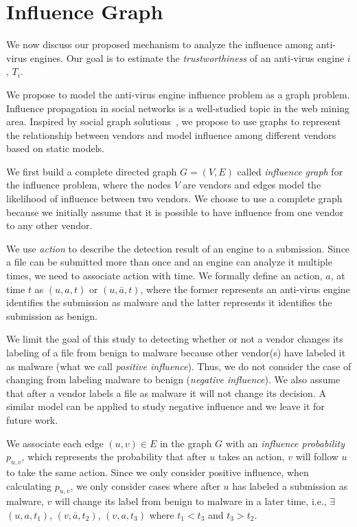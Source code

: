 \vspace{-0.05in}
\section{Influence Graph}
\label{sec:model}
We now discuss our proposed mechanism to analyze the influence among anti-virus engines.
Our goal is to estimate the {\em trustworthiness} of an anti-virus engine $i$, $T_i$.

We propose to model the anti-virus engine influence problem as a graph problem.
Influence propagation in social networks is a well-studied topic in the web mining area. 
Inspired by social graph solutions~\cite{Influence}, we propose to use graphs to represent the relationship between vendors 
and model influence among different vendors based on static models.

We first build a complete directed graph $G = (V, E)$ called {\em influence graph} for the influence problem, 
where the nodes $V$ are vendors and edges model the likelihood of influence between two vendors. 
We choose to use a complete graph because we initially assume that it is possible to have influence from one vendor to any other vendor.

We use {\em action} to describe the detection result of an engine to a submission. Since a file can be
submitted more than once and an engine can analyze it multiple times, we need to associate action with
time. We formally define an action, $a$, at time $t$ as $(u, a, t)$ or $(u, \bar{a}, t)$,
where the former represents an anti-virus engine identifies the submission as malware 
and the latter represents it identifies the submission as benign.

We limit the goal of this study to detecting whether or not a vendor changes its labeling of a file from
benign to malware because other vendor(s) have labeled it as malware (what we call {\em positive influence}). 
Thus, we do not consider the case of changing from labeling malware to benign ({\em negative influence}). 
We also assume that after a vendor labels a file as malware it will not change its decision.
A similar model can be applied to study negative influence and we leave it for future work.

We associate each edge $(u, v) \in E$ in the graph $G$ 
with an {\em influence probability} $p_{u,v}$,
which represents the probability that after $u$ takes an action, 
$v$ will follow $u$ to take the same action.
Since we only consider positive influence, 
when calculating $p_{u,v}$, we only consider cases where after $u$ has labeled a submission as malware, 
$v$ will change its label from benign to malware in a later time, i.e., 
$\exists$  $(u, a, t_1)$, $(v, \bar{a}, t_2)$, $(v, a, t_3)$ where $t_1<t_3$ and $t_3>t_2$. 

